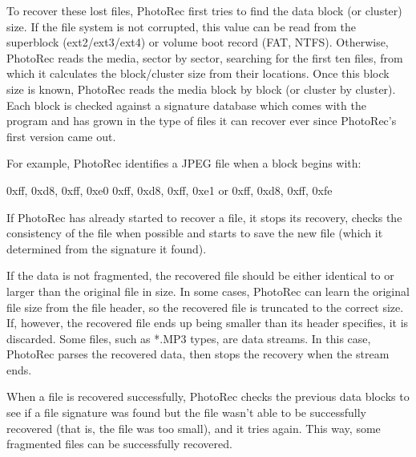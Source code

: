 To recover these lost files, PhotoRec first tries to find the data block (or cluster) size. If the file system is not corrupted, this value can be read from the superblock (ext2/ext3/ext4) or volume boot record (FAT, NTFS). Otherwise, PhotoRec reads the media, sector by sector, searching for the first ten files, from which it calculates the block/cluster size from their locations. Once this block size is known, PhotoRec reads the media block by block (or cluster by cluster). Each block is checked against a signature database which comes with the program and has grown in the type of files it can recover ever since PhotoRec's first version came out.

For example, PhotoRec identifies a JPEG file when a block begins with:

    0xff, 0xd8, 0xff, 0xe0
    0xff, 0xd8, 0xff, 0xe1
    or 0xff, 0xd8, 0xff, 0xfe

If PhotoRec has already started to recover a file, it stops its recovery, checks the consistency of the file when possible and starts to save the new file (which it determined from the signature it found).

If the data is not fragmented, the recovered file should be either identical to or larger than the original file in size. In some cases, PhotoRec can learn the original file size from the file header, so the recovered file is truncated to the correct size. If, however, the recovered file ends up being smaller than its header specifies, it is discarded. Some files, such as *.MP3 types, are data streams. In this case, PhotoRec parses the recovered data, then stops the recovery when the stream ends.

When a file is recovered successfully, PhotoRec checks the previous data blocks to see if a file signature was found but the file wasn't able to be successfully recovered (that is, the file was too small), and it tries again. This way, some fragmented files can be successfully recovered. 